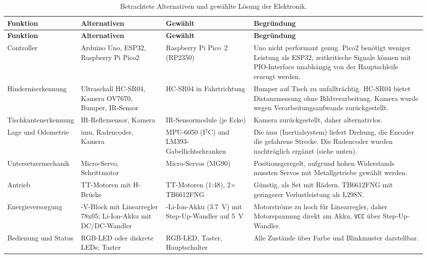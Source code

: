 {\footnotesize
\setlength{\tabcolsep}{3pt}
\renewcommand{\arraystretch}{0.95}
\newlength{\lastcol}\setlength{\lastcol}{\dimexpr\textwidth-1.7cm-2.7cm-2.6cm-8\tabcolsep\relax}
\begin{longtable}{@{}>{\raggedright\arraybackslash}p{1.7cm}>{\raggedright\arraybackslash}p{2.7cm}>{\raggedright\arraybackslash}p{2.6cm}>{\raggedright\arraybackslash}p{\lastcol}@{}}
\caption{Betrachtete Alternativen und gewählte Lösung der Elektronik.}\label{tab:elektronik-auswahl}\\
\toprule
\textbf{Funktion} & \textbf{Alternativen} & \textbf{Gewählt} & \textbf{Begründung}\\
\midrule
\endfirsthead
\toprule
\textbf{Funktion} & \textbf{Alternativen} & \textbf{Gewählt} & \textbf{Begründung}\\
\midrule
\endhead
\bottomrule
\endlastfoot
\midrule
Controller & Arduino Uno, ESP32, Raspberry Pi Pico2 & Raspberry Pi Pico~2 (RP2350) &
Uno nicht performant genug. Pico2 benötigt weniger Leistung als ESP32, zeitkritische Signale können mit PIO-Interface unabhängig von der Hauptschleife erzeugt werden. \\
\midrule
Hindernis\-erkennung & Ultraschall HC-SR04, Kamera OV7670, Bumper, IR-Sensor &
HC-SR04 in Fahrtrichtung &
Bumper auf Tisch zu unfallträchtig. HC-SR04 bietet Distanzmessung ohne Bildverarbeitung. Kamera wurde wegen Verarbeitungsaufwands zurückgestellt.\\
\midrule
Tischkanten\-erkennung & IR-Reflexsensor, Kamera & 4 IR-Sensormodule (je Ecke) & Kamera zurückgestellt, daher alternativlos. \\
\midrule
Lage und Odometrie & \acrshort{imu}, Radencoder, Kamera & MPU-6050 (I$^2$C) und LM393-Gabel\-lichtschranken &
Die \acrshort{imu} (Inertialsystem) liefert Drehung, die Encoder die gefahrene Strecke. Die Radencoder wurden nachträglich ergänzt (siehe unten).\\
\midrule
Untersetzer\-mechanik & Micro-Servo, Schrittmotor & 2 Micro-Servos (MG90) & Positionsgeregelt, aufgrund hohen Widerstands mussten Servos mit Metallgetriebe gewählt werden.\\
\midrule
Antrieb & TT-Motoren mit H-Brücke & 4 TT-Motoren (1:48), 2$\times$ TB6612FNG &
Günstig, als Set mit Rädern. TB6612FNG mit geringerer Verlustleistung als L298N.\\
\midrule
Energie\-versorgung & 9-V-Block mit Linearregler 78x05; Li-Ion-Akku mit DC/DC-Wandler &
18650-Li-Ion-Akku (\SI{3.7}{\volt}) mit Step-Up-Wandler auf \SI{5}{\volt} &
Motorströme zu hoch für Linearregler, daher Motorspannung direkt am Akku, \texttt{VCC} über Step-Up-Wandler. \\
\midrule
Bedienung und Status & RGB-LED oder diskrete LEDs; Taster & RGB-LED, Taster, Hauptschalter & Alle Zustände über Farbe und Blinkmuster darstellbar.\\
\end{longtable}
}


